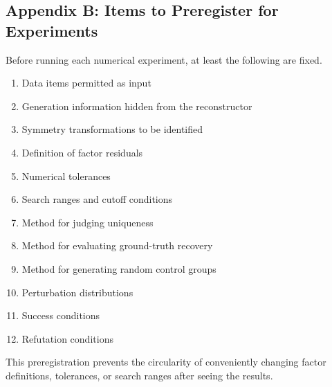 \documentclass[
  a4paper,
]{article}
\providecommand{\tightlist}{%
  \setlength{\itemsep}{0pt}\setlength{\parskip}{0pt}}
\begin{document}
\subsection{Appendix B: Items to Preregister for
Experiments}\label{appendix-b-items-to-preregister-for-experiments}

Before running each numerical experiment, at least the following are
fixed.

\begin{enumerate}
\def\labelenumi{\arabic{enumi}.}
\tightlist
\item
  Data items permitted as input
\item
  Generation information hidden from the reconstructor
\item
  Symmetry transformations to be identified
\item
  Definition of factor residuals
\item
  Numerical tolerances
\item
  Search ranges and cutoff conditions
\item
  Method for judging uniqueness
\item
  Method for evaluating ground-truth recovery
\item
  Method for generating random control groups
\item
  Perturbation distributions
\item
  Success conditions
\item
  Refutation conditions
\end{enumerate}

This preregistration prevents the circularity of conveniently changing
factor definitions, tolerances, or search ranges after seeing the
results.
\end{document}
